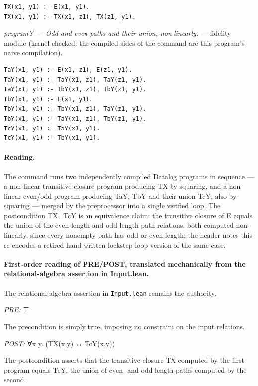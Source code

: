 \documentclass[10pt]{article}
\begin{document}
\begin{Verbatim}[fontsize=\scriptsize,breaklines=true,breakanywhere=true,frame=single,framesep=1.5mm]
TX(x1, y1) :- E(x1, y1).
TX(x1, y1) :- TX(x1, z1), TX(z1, y1).
\end{Verbatim}

{\raggedright\textit{programY --- Odd and even paths and their union, non-linearly.} --- fidelity module (kernel-checked: the compiled sides of the command are this program's naive compilation).\par}

\begin{Verbatim}[fontsize=\scriptsize,breaklines=true,breakanywhere=true,frame=single,framesep=1.5mm]
TaY(x1, y1) :- E(x1, z1), E(z1, y1).
TaY(x1, y1) :- TaY(x1, z1), TaY(z1, y1).
TaY(x1, y1) :- TbY(x1, z1), TbY(z1, y1).
TbY(x1, y1) :- E(x1, y1).
TbY(x1, y1) :- TbY(x1, z1), TaY(z1, y1).
TbY(x1, y1) :- TaY(x1, z1), TbY(z1, y1).
TcY(x1, y1) :- TaY(x1, y1).
TcY(x1, y1) :- TbY(x1, y1).
\end{Verbatim}

\paragraph{Reading.} The command runs two independently compiled Datalog programs in sequence --- a non-linear transitive-closure program producing TX by squaring, and a non-linear even/odd program producing TaY, TbY and their union TcY, also by squaring --- merged by the preprocessor into a single verified loop. The postcondition TX=TcY is an equivalence claim: the transitive closure of E equals the union of the even-length and odd-length path relations, both computed non-linearly, since every nonempty path has odd or even length; the header notes this re-encodes a retired hand-written lockstep-loop version of the same case.

\paragraph{First-order reading of PRE/POST, translated mechanically from the relational-algebra assertion in Input.lean.} The relational-algebra assertion in \texttt{Input.lean} remains the authority.

\textit{PRE:} ⊤\par The precondition is simply true, imposing no constraint on the input relations.

\textit{POST:} ∀x y. (TX(x,y) ↔ TcY(x,y))\par The postcondition asserts that the transitive closure TX computed by the first program equals TcY, the union of even- and odd-length paths computed by the second.
\end{document}
